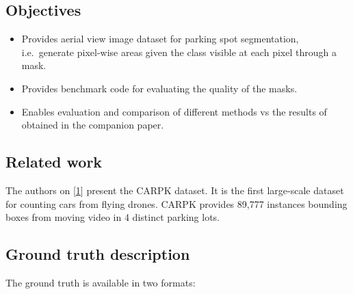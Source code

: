 \documentclass[]{article}
\providecommand{\tightlist}{%
  \setlength{\itemsep}{0pt}\setlength{\parskip}{0pt}}
\theoremstyle{definition}
\theoremstyle{definition}
\theoremstyle{definition}
\theoremstyle{remark}
\begin{document}
\hypertarget{objectives}{%
\subsection{Objectives}\label{objectives}}

\begin{itemize}
\tightlist
\item
  Provides aerial view image dataset for parking spot segmentation,
  i.e.~generate pixel-wise areas given the class visible at each pixel
  through a mask.
\item
  Provides benchmark code for evaluating the quality of the masks.
\item
  Enables evaluation and comparison of different methods vs the results
  of obtained in the companion paper.
\end{itemize}

\hypertarget{related-work}{%
\subsection{Related work}\label{related-work}}

The authors on
{[}\protect\hyperlink{ref-DBLP:journalsux2fcorrux2fHsiehLH17}{1}{]}
present the CARPK dataset. It is the first large-scale dataset for
counting cars from flying drones. CARPK provides 89,777 instances
bounding boxes from moving video in 4 distinct parking lots.

\hypertarget{ground-truth-description}{%
\subsection{Ground truth description}\label{ground-truth-description}}

The ground truth is available in two formats:
\end{document}
